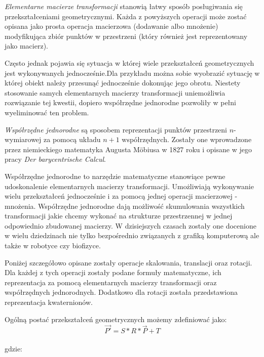 \documentclass[licencjacka]{pracamgr}
\begin{document}
\textit{Elementarne macierze transformacji} stanowią łatwy sposób posługiwania się przekształceniami geometrycznymi. Każda z powyższych operacji może zostać opisana jako prosta operacja macierzowa (dodawanie albo mnożenie) modyfikująca zbiór punktów w przestrzeni (który również jest reprezentowany jako macierz). %


Często jednak pojawia się sytuacja w której wiele przekształceń geometrycznych jest wykonywanych jednocześnie.Dla przykładu można sobie wyobrazić sytuację w której obiekt należy przesunąć jednocześnie dokonując jego obrotu. Niestety stosowanie samych elementarnych macierzy transformacji uniemożliwia rozwiązanie tej kwestii, dopiero współrzędne jednorodne pozwoliły w pełni wyeliminować ten problem.

\textit{Współrzędne jednorodne} są sposobem reprezentacji punktów przestrzeni $n$-wymiarowej za pomocą układu $n+1$ współrzędnych. Zostały one wprowadzone przez niemieckiego matematyka Augusta Möbiusa w 1827 roku i opisane w jego pracy \textit{Der barycentrische Calcul}. 

Współrzędne jednorodne to narzędzie matematyczne stanowiące pewne udoskonalenie elementarnych macierzy transformacji. Umożliwiają wykonywanie wielu przekształceń jednocześnie i za pomocą jednej operacji macierzowej - mnożenia. Współrzędne jednorodne dają możliwość skumulowania wszystkich transformacji jakie chcemy wykonać na strukturze przestrzennej w jednej odpowiednio zbudowanej macierzy. W dzisiejszych czasach zostały one docenione w wielu dziedzinach nie tylko bezpośrednio związanych z grafiką komputerową ale także w robotyce czy biofizyce.

Poniżej szczegółowo opisane zostały operacje skalowania, translacji oraz rotacji. Dla każdej z tych operacji zostały podane formuły matematyczne, ich reprezentacja za pomocą elementarnych macierzy transformacji oraz współrzędnych jednorodnych. Dodatkowo dla rotacji została przedstawiona reprezentacja kwaternionów.

\iffalse
Ogólną postać przekształceń geometrycznych możemy zdefiniować jako:
$$
\vec{P'}=S*R*\vec{P}+T
$$
\\
gdzie:
\\
\end{document}
